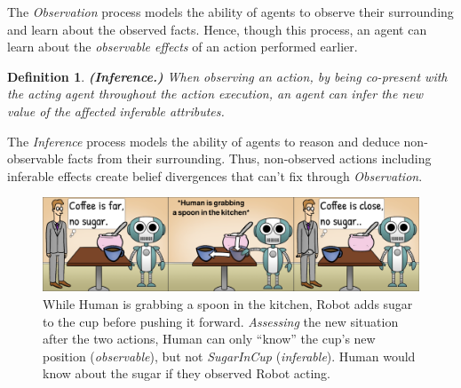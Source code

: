 \documentclass[letterpaper]{article} %
\newtheorem{definition}{Definition}
\begin{document}
The \textit{Observation} process models the ability of agents to observe their surrounding and 
learn about
the observed facts. Hence, though this process, an agent can learn about the \textit{observable effects} of an action performed earlier. 



\begin{definition} \label{def:inf}
    \textbf{(Inference.)} When observing an action, by being co-present with the acting agent throughout the action execution, an agent can infer the new value of the affected inferable attributes.  
\end{definition}


The \textit{Inference} process models the ability of agents to reason and deduce non-observable facts from their surrounding. Thus, non-observed actions including inferable effects create belief divergences that can't fix through \textit{Observation}. 

\begin{figure}[t!]
    \centering
    \includegraphics[width=1.0\linewidth]{figures/cartoon_obs(2).png}
    \caption{
    While Human is grabbing a spoon in the kitchen, Robot adds sugar to the cup before pushing it forward. \textit{Assessing} the new situation after the two actions, Human can only ``know'' the cup's new position (\textit{observable}), but not \textit{SugarInCup} (\textit{inferable}). Human would know about the sugar if they observed Robot acting.
    }
    \label{fig:cartoon}
\end{figure}
\end{document}
